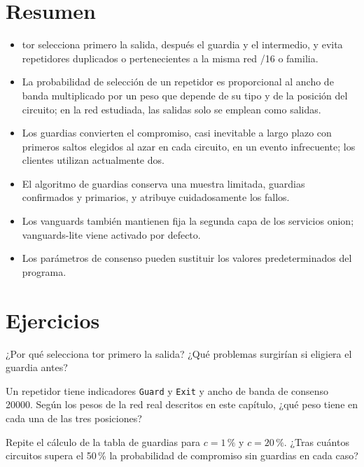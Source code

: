 \section*{Resumen}
\begin{itemize}
  \item tor selecciona primero la salida, después el guardia y el intermedio, y evita repetidores duplicados o pertenecientes a la misma red /16 o familia.
  \item La probabilidad de selección de un repetidor es proporcional al ancho de banda multiplicado por un peso que depende de su tipo y de la posición del circuito; en la red estudiada, las salidas solo se emplean como salidas.
  \item Los guardias convierten el compromiso, casi inevitable a largo plazo con primeros saltos elegidos al azar en cada circuito, en un evento infrecuente; los clientes utilizan actualmente dos.
  \item El algoritmo de guardias conserva una muestra limitada, guardias confirmados y primarios, y atribuye cuidadosamente los fallos.
  \item Los vanguards también mantienen fija la segunda capa de los servicios onion; vanguards-lite viene activado por defecto.
  \item Los parámetros de consenso pueden sustituir los valores predeterminados del programa.
\end{itemize}

\section*{Ejercicios}

\begin{esercizio}[1]\label{es:13-ordine}
¿Por qué selecciona tor primero la salida? ¿Qué problemas surgirían si eligiera el guardia antes?
\end{esercizio}

\begin{esercizio}[1]\label{es:13-peso}
Un repetidor tiene indicadores \texttt{Guard} y \texttt{Exit} y ancho de banda de consenso 20000. Según los pesos de la red real descritos en este capítulo, ¿qué peso tiene en cada una de las tres posiciones?
\end{esercizio}

\begin{esercizio}[2]\label{es:13-guard}
Repite el cálculo de la tabla de guardias para $c=1\,\%$ y $c=20\,\%$. ¿Tras cuántos circuitos supera el 50\,\% la probabilidad de compromiso sin guardias en cada caso?
\end{esercizio}

